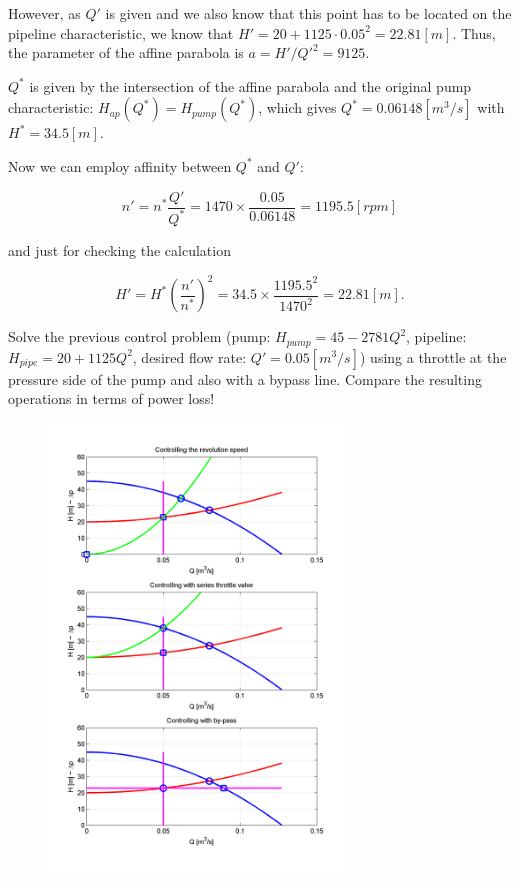 However, as $Q'$ is given and we also know that this point has to be located on the pipeline characteristic, we know that $H'= 20+1125 \cdot 0.05^2=22.81[m]$. Thus, the parameter of the affine parabola is $a=H'/Q'^2=9125$. 

$Q^*$ is given by the intersection of the affine parabola and the original pump characteristic: $H_{ap}(Q^*)=H_{pump}(Q^*)$, which gives $Q^*=0.06148[m^3/s]$ with $H^*=34.5[m]$.

Now we can employ affinity between $Q^*$ and $Q'$:

\begin{equation*}
n'=n^*\frac{Q'}{Q^*}=1470\times \frac{0.05}{0.06148}=1195.5 [rpm] 
\end{equation*}

and just for checking the calculation

\begin{equation*}
H'=H^* \left(\frac{n'}{n^*} \right)^2=34.5\times \frac{1195.5^2}{1470^2}=22.81 [m].
\end{equation*}


\vspace{1cm}

Solve the previous control problem (pump: $H_{pump}=45-2781 Q^2$, pipeline: $H_{pipe}=20+1125Q^2$, desired flow rate: $Q'=0.05 [m^3/s]$) using a throttle at the pressure side of the pump and also with a bypass line. Compare the resulting operations in terms of power loss!

\begin{figure}[!ht]
\centering
\includegraphics[width=0.7\textwidth]{Problem_solving/figs/PS_Control1.png}
\end{figure}

